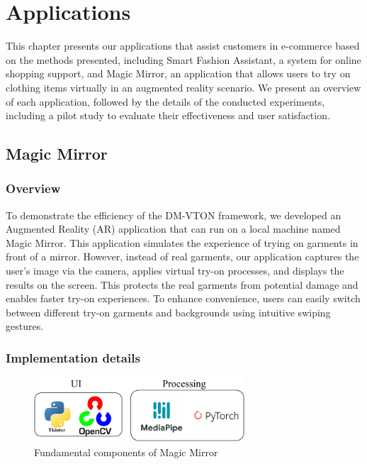 \chapter{Applications}
\label{chapter-applications}
\begin{ChapAbstract}
This chapter presents our applications that assist customers in e-commerce based on the methods presented, including Smart Fashion Assistant, a system for online shopping support, and Magic Mirror, an application that allows users to try on clothing items virtually in an augmented reality scenario. We present an overview of each application, followed by the details of the conducted experiments, including a pilot study to evaluate their effectiveness and user satisfaction.
\end{ChapAbstract}

\section{Magic Mirror}
\subsection{Overview}

To demonstrate the efficiency of the DM-VTON framework, we developed an Augmented Reality (AR) application that can run on a local machine named Magic Mirror. This application simulates the experience of trying on garments in front of a mirror. However, instead of real garments, our application captures the user's image via the camera, applies virtual try-on processes, and displays the results on the screen. This protects the real garments from potential damage and enables faster try-on experiences. To enhance convenience, users can easily switch between different try-on garments and backgrounds using intuitive swiping gestures.



\subsection{Implementation details}

 \begin{figure}[h!]
  \centering
  \includegraphics[width=0.7\textwidth]{content/resources/images/application/chapter5-ar-arch.pdf}
  \caption{Fundamental components of Magic Mirror}
  \label{fig:chapter5-ar-arch}
\end{figure}


